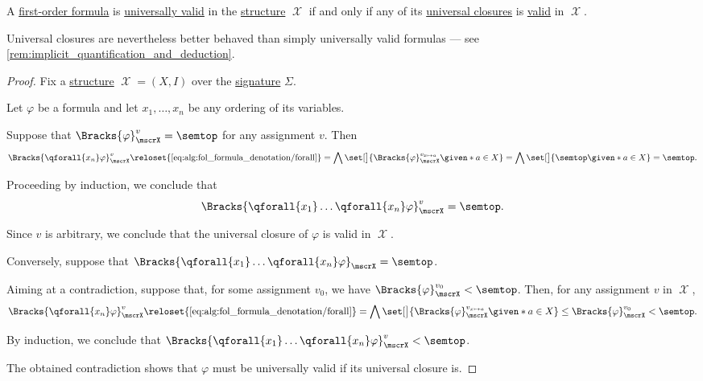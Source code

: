 \begin{proposition}\label{thm:fol_universal_validity_iff_closure_validity}
 A \hyperref[def:fol_formula]{first-order formula} is \hyperref[def:fol_universal_validity]{universally valid} in the \hyperref[def:fol_structure]{structure} \( \mscrX \) if and only if any of its \hyperref[def:fol_quantifier_closure]{universal closures} is \hyperref[def:fol_semantics/model]{valid} in \( \mscrX \).
\end{proposition}
\begin{comments}
  \item Universal closures are nevertheless better behaved than simply universally valid formulas --- see \cref{rem:implicit_quantification_and_deduction}.
\end{comments}
\begin{proof}
  Fix a \hyperref[def:hol_structure]{structure} \( \mscrX = (X, I) \) over the \hyperref[def:hol_signature]{signature} \( \Sigma \).

  Let \( \varphi \) be a formula and let \( x_1, \ldots, x_n \) be any ordering of its variables.

  \SufficiencySubProof Suppose that \( \Bracks{ \varphi }_\mscrX^v = \semtop \) for any assignment \( v \). Then
  \begin{equation*}
    \Bracks{ \qforall {x_n} \varphi }_\mscrX^v
    \reloset {\eqref{eq:alg:fol_formula_denotation/forall}} =
    \bigwedge\set[\big]{ \Bracks{ \varphi }_\mscrX^{v_{x \mapsto a}} \given* a \in X }
    =
    \bigwedge\set[\big]{ \semtop \given* a \in X }
    =
    \semtop.
  \end{equation*}

  Proceeding by induction, we conclude that
  \begin{equation*}
    \Bracks{ \qforall {x_1} \ldots \qforall {x_n} \varphi }_\mscrX^v = \semtop.
  \end{equation*}

  Since \( v \) is arbitrary, we conclude that the universal closure of \( \varphi \) is valid in \( \mscrX \).

  \NecessitySubProof Conversely, suppose that \( \Bracks{ \qforall {x_1} \ldots \qforall {x_n} \varphi }_\mscrX = \semtop \).

  Aiming at a contradiction, suppose that, for some assignment \( v_0 \), we have \( \Bracks{ \varphi }_\mscrX^{v_0} < \semtop \). Then, for any assignment \( v \) in \( \mscrX \),
  \begin{equation*}
    \Bracks{ \qforall {x_n} \varphi }_\mscrX^v
    \reloset {\eqref{eq:alg:fol_formula_denotation/forall}} =
    \bigwedge\set[\big]{ \Bracks{ \varphi }_\mscrX^{v_{x \mapsto a}} \given* a \in X }
    \leq
    \Bracks{ \varphi }_\mscrX^{v_0}
    <
    \semtop.
  \end{equation*}

  By induction, we conclude that  \( \Bracks{ \qforall {x_1} \ldots \qforall {x_n} \varphi }_\mscrX^v < \semtop \).

  The obtained contradiction shows that \( \varphi \) must be universally valid if its universal closure is.
\end{proof}

